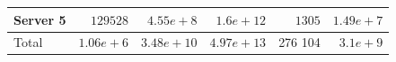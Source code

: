 \begin{table}[h]
\begin{tabular}{l|r|r|r|r|r|}
\multicolumn{1}{|l|}{Server 5} & $129 528$                  & $4.55e+8$                    & $1.6e+12$                  & $1 305$                                                                         & $1.49e+7$                                                                     \\ \hline
\multicolumn{1}{|l|}{Total}    & $1.06e+6$                  & $3.48e+10$                   & $4.97e+13$                 & 276 104                                                                         & $3.1e+9$                                                                      \\ \hline
\end{tabular}
\end{table}

